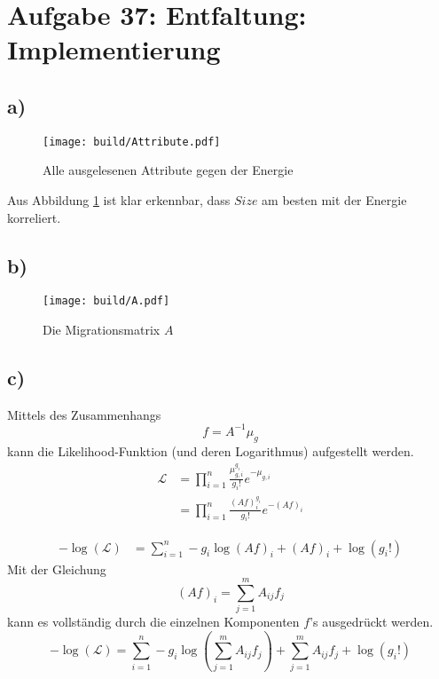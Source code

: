 \section*{Aufgabe 37: Entfaltung: Implementierung}
\label{sec:Aufgabe1}

\subsection*{a)}
\begin{figure}
    \centering
    \texttt{[image: build/Attribute.pdf]}
    \caption{Alle ausgelesenen Attribute gegen der Energie}
    \label{fig:Attribute}
\end{figure}
Aus Abbildung \ref{fig:Attribute} ist klar erkennbar, dass $Size$ am besten mit der Energie korreliert.

\subsection*{b)}
\begin{figure}
    \centering
    \texttt{[image: build/A.pdf]}
    \caption{Die Migrationsmatrix $A$}
    \label{fig:A}
\end{figure}


\subsection*{c)}
Mittels des Zusammenhangs
\begin{equation}
    f = A^{-1}\mu_g
\end{equation}
kann die Likelihood-Funktion (und deren Logarithmus) aufgestellt werden.
\begin{align}
    \mathcal{L} &= \prod_{i=1}^n \frac{\mu_{g,i}^{g_i}}{g_i!}e^{-\mu_{g,i}}\nonumber\\
                &= \prod_{i=1}^n \frac{\left(Af\right)_i^{g_i}}{g_i!}e^{-\left(Af\right)_i}
\end{align}

\begin{align}
    -\log\left(\mathcal{L}\right) &= \sum_{i=1}^n -g_i \log\left(Af\right)_i + \left(Af\right)_i + \log\left(g_i!\right)
\end{align}
Mit der Gleichung
\begin{equation}
    \left(Af\right)_i = \sum_{j=1}^m A_{ij}f_j
\end{equation}
kann es vollständig durch die einzelnen Komponenten $f$'s ausgedrückt werden.
\begin{equation}
    -\log\left(\mathcal{L}\right) = \sum_{i=1}^n -g_i \log\left(\sum_{j=1}^m A_{ij}f_j\right) + \sum_{j=1}^m A_{ij}f_j + \log\left(g_i!\right)
\end{equation}

